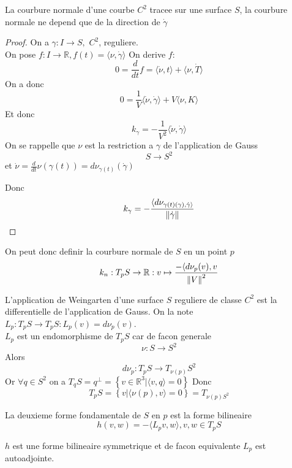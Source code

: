 \documentclass[../main.tex]{subfiles}
\begin{document}
\begin{thm}[de Meusnier]
	La courbure normale d'une courbe $C^{2}$ tracee sur une surface $S$, la courbure normale ne depend que de la direction de $\dot\gamma$
\end{thm}
\begin{proof}
On a $\gamma:I\to S, $ $C^{2}$, reguliere.\\
On pose $f:I\to \mathbb{R}, f( t) = \langle \nu,\dot\gamma\rangle$ On derive $f:$ 
\[ 
0 = \frac{d}{dt}f = \langle \dot\nu,t\rangle + \langle \nu, \dot T\rangle
\]
On a donc
\[ 
0 = \frac{1}{V} \langle \dot\nu,\dot\gamma\rangle + V \langle \nu, K\rangle
\]
Et donc
\[ 
k_{\gamma} = - \frac{1}{V^{2}}\langle \dot\nu,\dot\gamma\rangle
\]
On se rappelle que $\nu$ est la restriction a $\gamma$ de l'application de Gauss
\[ 
S\to S^{2}
\]
et $\dot\nu= \frac{d}{dt}\nu( \gamma( t) )= d\nu_{\gamma( t) } ( \dot\gamma)  $ 

Donc
\[ 
k_\gamma = - \frac{\langle d\nu_{\gamma( t) ( \gamma) , \dot\gamma\rangle} }{\left\lVert \dot\gamma\right\rVert }
\]


\end{proof}
On peut donc definir la courbure normale de $S$ en un point $p$
\[ 
k_n: T_p S \to \mathbb{R}: v \mapsto \frac{- \langle d\nu_p( v),v}{\left\lVert V\right\rVert ^{2}}
\]
\begin{defn}
	L'application de Weingarten d'une surface $S$ reguliere de classe $C^{2}$ est la differentielle de l'application de Gauss.
On la note $L_p: T_p S\to T_p S: L_p( v) = d\nu_p( v) $.\\
$L_p$ est un endomorphisme de $T_pS$ car de facon generale 
\[ 
	\nu: S \to S^{2}
\]
Alors 
\[ 
d\nu_p : T_pS \to T_{\nu( p) } S^{2}
\]
Or $\forall q \in S^{2}$ on a $T_qS = q^{\perp}= \left\{ v \in \mathbb{R}^{3}| \langle v,q\rangle = 0  \right\} $ 
Donc
\[ 
T_pS = \left\{ v| \langle \nu( p) , v\rangle = 0 \right\} = T_{\nu( p) S^{2}} 
\]

\end{defn}
\begin{defn}
	La deuxieme forme fondamentale de $S$ en $p$ est la forme bilineaire
	\[ 
	h( v,w) = - \langle L_pv,w\rangle, v,w \in T_pS
	\]
		
\end{defn}
\begin{propo}
$h$ est une forme bilineaire symmetrique et de facon equivalente
$L_p$ est autoadjointe.
\end{propo}
\end{document}
